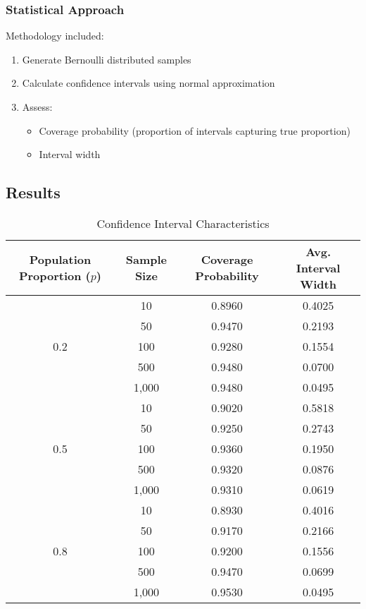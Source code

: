 \documentclass[12pt]{article}
\begin{document}
\subsubsection{Statistical Approach}
Methodology included:
\begin{enumerate}
    \item Generate Bernoulli distributed samples
    \item Calculate confidence intervals using normal approximation
    \item Assess:
    \begin{itemize}
        \item Coverage probability (proportion of intervals capturing true proportion)
        \item Interval width
    \end{itemize}
\end{enumerate}

\subsection{Results}

\begin{table}[htbp]
    \centering
    \caption{Confidence Interval Characteristics}
    \label{tab:election_polling_results}
    \begin{tabular}{cccc}
        \hline
        Population Proportion ($p$) & Sample Size & Coverage Probability & Avg. Interval Width \\
        \hline
        \multirow{5}{*}{0.2} & 10 & 0.8960 & 0.4025 \\
        & 50 & 0.9470 & 0.2193 \\
        & 100 & 0.9280 & 0.1554 \\
        & 500 & 0.9480 & 0.0700 \\
        & 1,000 & 0.9480 & 0.0495 \\
        \hline
        \multirow{5}{*}{0.5} & 10 & 0.9020 & 0.5818 \\
        & 50 & 0.9250 & 0.2743 \\
        & 100 & 0.9360 & 0.1950 \\
        & 500 & 0.9320 & 0.0876 \\
        & 1,000 & 0.9310 & 0.0619 \\
        \hline
        \multirow{5}{*}{0.8} & 10 & 0.8930 & 0.4016 \\
        & 50 & 0.9170 & 0.2166 \\
        & 100 & 0.9200 & 0.1556 \\
        & 500 & 0.9470 & 0.0699 \\
        & 1,000 & 0.9530 & 0.0495 \\
        \hline
    \end{tabular}
\end{table}
\end{document}
